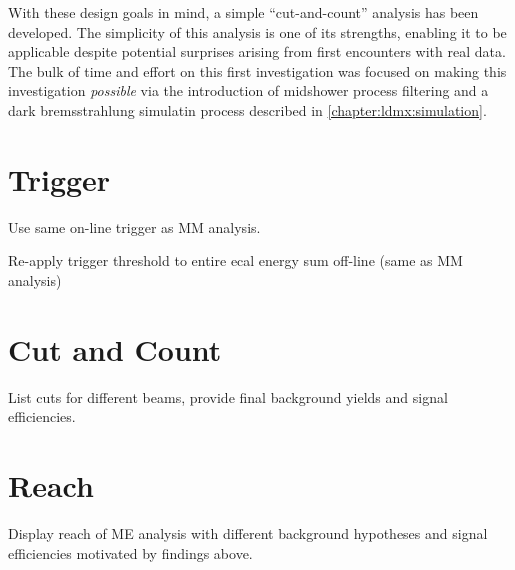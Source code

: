 With these design goals in mind, a simple ``cut-and-count'' analysis has been developed.
The simplicity of this analysis is one of its strengths, enabling it to be applicable
despite potential surprises arising from first encounters with real data.
The bulk of time and effort on this first investigation was focused on making this
investigation \emph{possible} via the introduction of midshower process filtering
and a dark bremsstrahlung simulatin process described in \cref{chapter:ldmx:simulation}.

\section{Trigger}
Use same on-line trigger as MM analysis.

Re-apply trigger threshold to entire ecal energy sum off-line (same as MM analysis)

\section{Cut and Count}
List cuts for different beams, provide final background yields and signal efficiencies.

\section{Reach}
Display reach of ME analysis with different background hypotheses and signal efficiencies
motivated by findings above.

